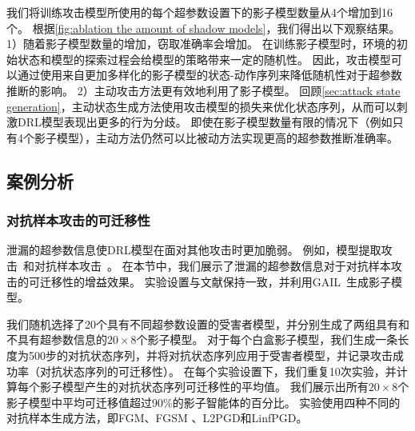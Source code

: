 我们将训练攻击模型所使用的每个超参数设置下的影子模型数量从4个增加到16个。
根据\autoref{fig:ablation the amount of shadow models}，我们得出以下观察结果。
1）随着影子模型数量的增加，窃取准确率会增加。
在训练影子模型时，环境的初始状态和模型的探索过程会给模型的策略带来一定的随机性。
因此，攻击模型可以通过使用来自更加多样化的影子模型的状态-动作序列来降低随机性对于超参数推断的影响。
2）主动攻击方法更有效地利用了影子模型。
回顾\autoref{sec:attack state generation}，主动状态生成方法使用攻击模型的损失来优化状态序列，从而可以刺激DRL模型表现出更多的行为分歧。
即使在影子模型数量有限的情况下（例如只有4个影子模型），主动方法仍然可以比被动方法实现更高的超参数推断准确率。

\subsection{案例分析}
\label{sec:case study}
\subsubsection{对抗样本攻击的可迁移性}
泄漏的超参数信息使DRL模型在面对其他攻击时更加脆弱。
例如，模型提取攻击~\cite{TZJRR16}和对抗样本攻击~\cite{HPGDA17, BM17, LHLSLS17, KS17}。
在本节中，我们展示了泄漏的超参数信息对于对抗样本攻击的可迁移性的增益效果。
实验设置与文献{\rm\parencite{CGZXL21}}保持一致，并利用GAIL~\cite{DBLP:conf/nips/HoE16}生成影子模型。

我们随机选择了20个具有不同超参数设置的受害者模型，并分别生成了两组具有和不具有超参数信息的$20 \times 8$个影子模型。
对于每个白盒影子模型，我们生成一条长度为500步的对抗状态序列，并将对抗状态序列应用于受害者模型，并记录攻击成功率（对抗状态序列的可迁移性）。
在每个实验设置下，我们重复10次实验，并计算每个影子模型产生的对抗状态序列可迁移性的平均值。
我们展示出所有$20 \times 8$个影子模型中平均可迁移值超过90\%的影子智能体的百分比。
实验使用四种不同的对抗样本生成方法，即FGM、FGSM \cite{DBLP:journals/corr/GoodfellowSS14}、L2PGD和LinfPGD\cite{DBLP:conf/iclr/KurakinGB17a, DBLP:conf/iclr/MadryMSTV18}。

